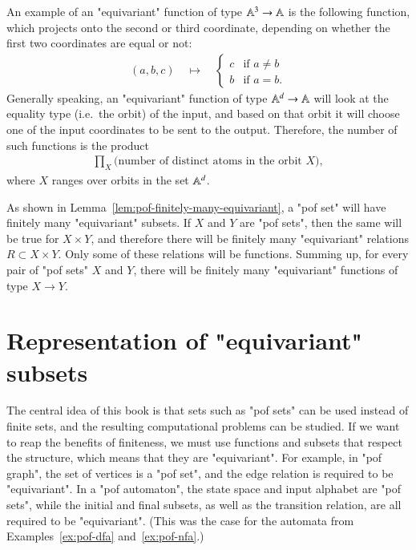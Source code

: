 \begin{myexample}
    An example of an "equivariant" function of type $\mathbb A^3 \to \mathbb A$ is the following function, which projects onto the second or third coordinate, depending on whether the first two coordinates are equal or not:
    \begin{align*}
    (a,b,c) 
    \quad \mapsto \quad 
        \begin{cases}
            c & \text{if $a \neq b$} \\
            b & \text{if $a = b$}.
        \end{cases}
    \end{align*}
    Generally speaking, an "equivariant" function of type $\mathbb A^d \to \mathbb A$ will look at the equality type (i.e.~the orbit) of the input, and based on that orbit it will choose one of the input coordinates to be sent to the output. Therefore, the number of such functions is the product
    \begin{align*}
    \prod_X  \text{(number of distinct atoms in the orbit $X$)},
    \end{align*}
    where $X$ ranges over orbits in the set $\mathbb A^d$. 
\end{myexample}

As shown in Lemma~\ref{lem:pof-finitely-many-equivariant}, a "pof set" will have finitely many "equivariant" subsets. If $X$ and $Y$ are "pof sets", then the same will be true for $X \times Y$, and therefore there will be  finitely many "equivariant" relations $R \subset X \times Y$. Only some of these relations will be functions. Summing up, for every pair of "pof sets" $X$ and $Y$, there will be finitely many "equivariant" functions of type $X \to Y$.


\exercisepart

\section{Representation of "equivariant"  subsets}
\label{sec:pof-representation}
The central idea of this book is that sets such as  "pof sets"  can be used instead of finite sets, and the resulting computational problems can be studied.  
If we want to reap the benefits of finiteness, we must use functions and subsets that respect the structure, which means that they are  "equivariant".  For example, in "pof graph", the set of vertices is a "pof set", and the edge relation is required to be "equivariant". In a  "pof automaton",   the state space and input alphabet are "pof sets", while the initial and final subsets, as well as the transition relation, are all required to be  "equivariant".  (This was the case for the automata from Examples~\ref{ex:pof-dfa} and~\ref{ex:pof-nfa}.) 

